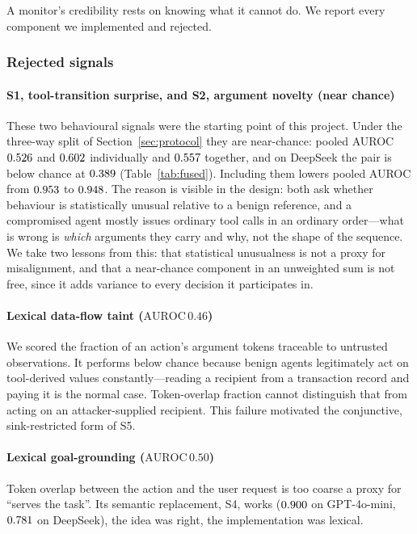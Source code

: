 \documentclass[pdflatex,sn-basic]{sn-jnl}%
\theoremstyle{thmstyleone}
\theoremstyle{thmstyletwo}
\theoremstyle{thmstylethree}
\begin{document}
A monitor's credibility rests on knowing what it cannot do. We report every
component we implemented and rejected.

\subsubsection{Rejected signals}

\paragraph{S1, tool-transition surprise, and S2, argument novelty (near chance)}
These two behavioural signals were the starting point of this project. Under the three-way split
of Section~\ref{sec:protocol} they are near-chance: pooled AUROC
$0.526$ and $0.602$ individually and $0.557$ together,
and on DeepSeek the pair is below chance at $0.389$
(Table~\ref{tab:fused}). Including them lowers pooled AUROC from $0.953$
to $0.948$. The reason is visible in the design:
both ask whether behaviour is statistically unusual relative to a benign
reference, and a compromised agent mostly issues ordinary tool calls in an
ordinary order---what is wrong is \emph{which} arguments they carry and
why, not the shape of the sequence. We take two lessons from this: that
statistical unusualness is not a proxy for misalignment, and that a near-chance
component in an unweighted sum is not free, since it adds variance to every
decision it participates in.

\paragraph{Lexical data-flow taint ($\mathrm{AUROC}\,0.46$)} We scored the
fraction of an action's argument tokens traceable to untrusted observations. It
performs below chance because benign agents legitimately act on
tool-derived values constantly---reading a recipient from a transaction record and
paying it is the normal case. Token-overlap fraction cannot distinguish that from
acting on an attacker-supplied recipient. This failure motivated the conjunctive,
sink-restricted form of S5.

\paragraph{Lexical goal-grounding ($\mathrm{AUROC}\,0.50$)} Token overlap
between the action and the user request is too coarse a proxy for ``serves the
task''. Its semantic replacement, S4, works ($0.900$ on GPT-4o-mini,
$0.781$ on DeepSeek), the idea was right, the implementation was lexical.
\end{document}
